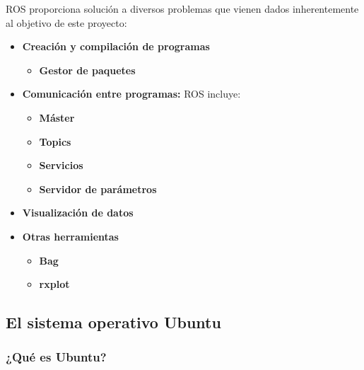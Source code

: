 \documentclass[10pt,a4paper]{report}
\begin{document}
ROS proporciona solución a diversos problemas que vienen dados inherentemente al objetivo de este proyecto:

\begin{itemize}

\item \textbf{Creación y compilación de programas}

\begin{itemize}

\item \textbf{Gestor de paquetes}

\end{itemize}

\item \textbf{Comunicación entre programas:}
ROS incluye:

\begin{itemize}

\item \textbf{Máster}

\item \textbf{Topics}

\item \textbf{Servicios}

\item \textbf{Servidor de parámetros}

\end{itemize}

\item \textbf{Visualización de datos}

\item \textbf{Otras herramientas}

\begin{itemize}

\item \textbf{Bag}

\item \textbf{rxplot}

\end{itemize}


\end{itemize}

\subsection{El sistema operativo Ubuntu}

\subsubsection{¿Qué es Ubuntu?}
\end{document}
